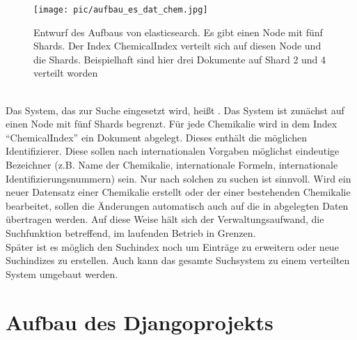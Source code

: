 \begin{figure}[h]
  \centering
    \texttt{[image: pic/aufbau\_es\_dat\_chem.jpg]}
      \caption[Aufbau von elasticsearch]{Entwurf des Aufbaus von elasticsearch.
      Es gibt einen Node mit fünf Shards. Der Index ChemicalIndex verteilt sich
      auf diesen Node und die Shards. Beispielhaft sind hier drei Dokumente auf
      Shard 2 und 4 verteilt worden}
      \label{fig:aufbau_es_dat_chem}
\end{figure}
\\
Das System, das zur Suche eingesetzt wird, heißt . Das
System ist zunächst auf einen Node mit fünf Shards begrenzt. Für jede Chemikalie
wird in dem Index "`ChemicalIndex"' ein Dokument abgelegt. Dieses enthält die
möglichen Identifizierer. Diese sollen nach internationalen Vorgaben möglichst
eindeutige Bezeichner (z.B. Name der Chemikalie, internationale Formeln,
internationale Identifizierungsnummern) sein. Nur nach solchen zu suchen ist sinnvoll.
Wird ein neuer Datensatz einer Chemikalie erstellt oder der einer bestehenden
Chemikalie bearbeitet, sollen die Änderungen automatisch auch auf die in
 abgelegten Daten übertragen werden. Auf diese Weise hält
sich der Verwaltungsaufwand, die Suchfunktion betreffend, im laufenden Betrieb
in Grenzen.
\\
Später ist es möglich den Suchindex noch um Einträge zu erweitern oder
neue Suchindizes zu erstellen. Auch kann das gesamte Suchsystem zu einem
verteilten System umgebaut werden.

\section{Aufbau des Djangoprojekts}
\label{aufbau_djangoprojekt_kon}

